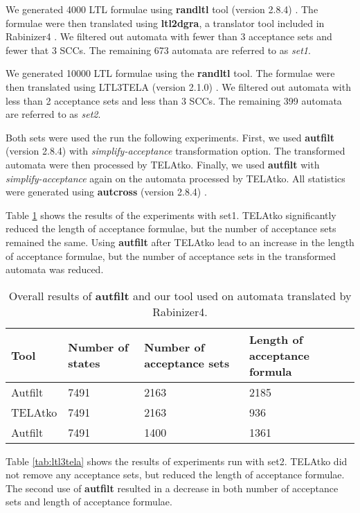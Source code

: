 \documentclass[
  digital, %
  twoside, %
  table,   %
  lof,     %
  lot,     %
]{fithesis3}
\begin{document}
We generated 4000 LTL \cite{ltl} formulae using \textbf{randltl} tool (version 2.8.4) \cite{randltl}. The formulae were then translated using \textbf{ltl2dgra}, a translator tool included in Rabinizer4 \cite{rabinizer}. We filtered out automata with fewer than 3 acceptance sets and fewer that 3 SCCs. The remaining 673 automata are referred to as \emph{set1}.

We generated 10000 LTL formulae using the \textbf{randltl} tool. The formulae were then translated using LTL3TELA (version 2.1.0) \cite{ltl3tela}. We filtered out automata with less than 2 acceptance sets and less than 3 SCCs. The remaining 399 automata are referred to as \emph{set2}.

Both sets were used the run the following experiments. First, we used \textbf{autfilt} (version 2.8.4) \cite{spot} with \emph{simplify-acceptance} transformation option. The transformed automata were then processed by TELAtko. Finally, we used \textbf{autfilt} with \emph{simplify-acceptance} again on the automata processed by TELAtko. All statistics were generated using \textbf{autcross} (version 2.8.4) \cite{spot}.

Table \ref{tab:rabinizer4} shows the results of the experiments with set1. TELAtko significantly reduced the length of acceptance formulae, but the number of acceptance sets remained the same. Using \textbf{autfilt} after TELAtko lead to an increase in the length of acceptance formulae, but the number of acceptance sets in the transformed automata was reduced.

\begin{table}[h]
  \begin{tabularx}{\textwidth}{lXXX}
    \toprule
    Tool & Number of states & Number of acceptance sets & Length of acceptance formula  \\
    \midrule
    Autfilt & 7491 & 2163 & 2185 \\
    TELAtko & 7491 & 2163 & 936 \\
    Autfilt & 7491 & 1400 & 1361 \\    
    \bottomrule
  \end{tabularx}
  \caption{Overall results of \textbf{autfilt} and our tool used on automata translated by Rabinizer4.}
  \label{tab:rabinizer4}
\end{table}

Table \ref{tab:ltl3tela} shows the results of experiments run with set2. TELAtko did not remove any acceptance sets, but reduced the length of acceptance formulae. The second use of \textbf{autfilt} resulted in a decrease in both number of acceptance sets and length of acceptance formulae.
\end{document}
